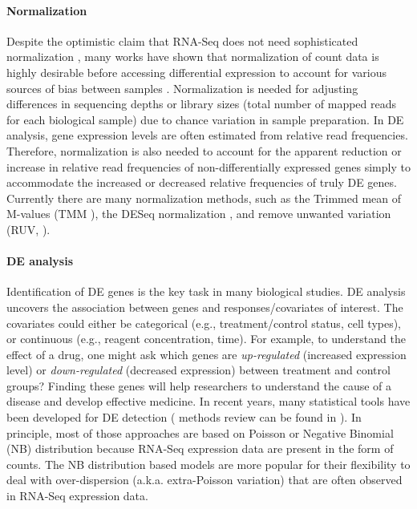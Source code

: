 \paragraph*{Normalization}
Despite the optimistic claim that RNA-Seq does not need sophisticated normalization
\citep{wang2009rna}, many works have shown that normalization of count data is highly desirable
before accessing differential expression to account for various sources of bias between samples
\citep{anders2010differential, dillies2013comprehensive,hansen2012removing, risso2014nat,
	risso2011gc,robinson2010scaling}. Normalization is needed for adjusting differences in sequencing
depths or library sizes (total number of mapped reads for each biological sample) due to chance
variation in sample preparation. In DE analysis, gene expression levels are often estimated from
relative read frequencies. Therefore, normalization is also needed to account for the apparent
reduction or increase in relative read frequencies of non-differentially expressed genes simply to
accommodate the increased or decreased relative frequencies of truly DE genes. Currently there are
many normalization methods, such as the Trimmed mean of M-values (TMM \citep{robinson2010scaling}),
the DESeq normalization \citep{anders2010differential}, and remove unwanted variation (RUV,
\citep{risso2014nat}). 

\paragraph*{DE analysis}
Identification of DE genes is the key task in many biological studies. DE analysis uncovers the
association between genes and responses/covariates of interest. The covariates could either be
categorical (e.g., treatment/control status, cell types), or continuous (e.g., reagent
concentration, time). For example, to understand the effect of a drug, one might ask which genes are
\textit{up-regulated} (increased expression level) or \textit{down-regulated} (decreased expression)
between treatment and control groups? Finding these genes will help researchers to understand the
cause of a disease and develop effective medicine. In recent years, many statistical tools have been developed for DE detection (
methods review can be found in \cite{rapaport2013comprehensive,seyednasrollah2015comparison,
	soneson2013comparison}). 
In principle, most of those approaches are based on Poisson \citep{marioni2008rna, wang2010degseq}
or Negative Binomial (NB) distribution
\citep{anders2010differential,di2011nbp,oberg2012technical,robinson2007moderated, wu2013new} because
RNA-Seq expression data are present in the form of counts. %
The NB distribution based models are more popular for their flexibility to deal with 
over-dispersion (a.k.a. extra-Poisson variation) that are often observed in RNA-Seq expression data.



